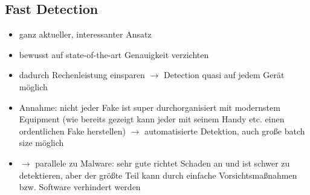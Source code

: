 \subsection{Fast Detection}
\begin{itemize}
  \item ganz aktueller, interessanter Ansatz \citep[][]{Kawa2022}
  \item bewusst auf state-of-the-art Genauigkeit verzichten
  \item dadurch Rechenleistung einsparen $\rightarrow$ Detection quasi auf jedem Gerät möglich
  \item Annahme: nicht jeder Fake ist super durchorganisiert mit modernstem Equipment (wie bereits gezeigt kann jeder mit seinem Handy etc. einen ordentlichen Fake herstellen) $\rightarrow$ automatisierte Detektion, auch große batch size möglich
  \item $\rightarrow$ parallele zu Malware: sehr gute richtet Schaden an und ist schwer zu detektieren, aber der größte Teil kann durch \glqq{}einfache\grqq{} Vorsichtsmaßnahmen bzw. Software verhindert werden
\end{itemize}